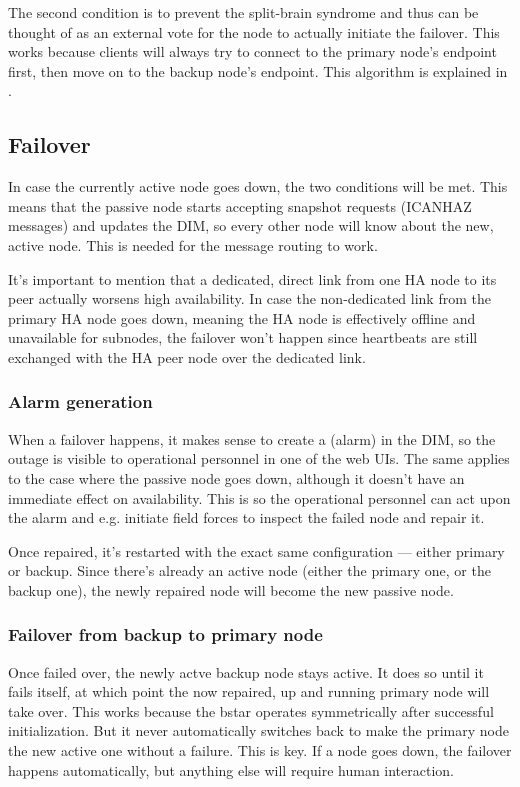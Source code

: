 The second condition is to prevent the split-brain syndrome and thus can be
thought of as an external vote for the node to actually initiate the failover.
This works because clients will always try to connect to the primary node's
endpoint first, then move on to the backup node's endpoint. This algorithm is
explained in \cite[Chapter 4 - Reliable Request-Reply Patterns, Client-Side
Reliability (Lazy Pirate Pattern)]{zmq:zguide}.

\subsection{Failover}
In case the currently active node goes down, the two conditions will be met.
This means that the passive node starts accepting snapshot requests (ICANHAZ
messages) and updates the DIM, so every other node will know about the new,
active node. This is needed for the message routing to work.

It's important to mention that a dedicated, direct link from one HA node to its
peer actually worsens high availability. In case the non-dedicated link from
the primary HA node goes down, meaning the HA node is effectively offline and
unavailable for subnodes, the failover won't happen since heartbeats are still
exchanged with the HA peer node over the dedicated link.

\subsubsection{Alarm generation}
When a failover happens, it makes sense to create a  (alarm) in the
DIM, so the outage is visible to operational personnel in one of the web UIs.
The same applies to the case where the passive node goes down, although it
doesn't have an immediate effect on availability.  This is so the operational
personnel can act upon the alarm and e.g. initiate field forces to inspect the
failed node and repair it.

Once repaired, it's restarted with the exact same configuration --- either primary
or backup. Since there's already an active node (either the primary one,
or the backup one), the newly repaired node will become the new passive node.

\subsubsection{Failover from backup to primary node}
Once failed over, the newly actve backup node stays active. It does so until it
fails itself, at which point the now repaired, up and running primary node will
take over. This works because the \gls{bstar} operates symmetrically
after successful initialization. But it never automatically switches back to
make the primary node the new active one without a failure. This is key. If a
node goes down, the failover happens automatically, but anything else will
require human interaction.

